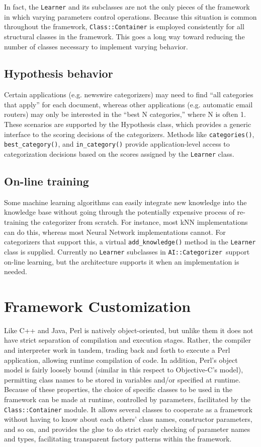 \documentclass[twocolumn]{article}
\newcommand{\method}[1]{\texttt{#1()}}
\newcommand{\class}[1]{\texttt{#1}}
\newcommand{\aicat}{\texttt{AI::Cat\-e\-gor\-i\-zer}}
\begin{document}
In fact, the \class{Learner} and its subclasses are not the only
pieces of the framework in which varying parameters control
operations.  Because this situation is common throughout the
framework, \class{Class::Container} is employed consistently for all
structural classes in the framework.  This goes a long way toward
reducing the number of classes necessary to implement varying
behavior.

\subsection*{Hypothesis behavior}
Certain applications (e.g. newswire categorizers) may need to find
``all categories that apply'' for each document, whereas other
applications (e.g. automatic email routers) may only be interested in
the ``best N categories,'' where N is often 1.  These scenarios are
supported by the Hypothesis class, which provides a generic interface
to the scoring decisions of the categorizers.  Methods like
\method{categories}, \method{best\_category}, and
\method{in\_category} provide application-level access to
categorization decisions based on the scores assigned by the
\class{Learner} class.

\subsection*{On-line training}
Some machine learning algorithms can easily integrate new knowledge
into the knowledge base without going through the potentially
expensive process of re-training the categorizer from scratch.  For
instance, most kNN implementations can do this, whereas most Neural
Network implementations cannot.  For categorizers that support this, a
virtual \method{add\_knowledge} method in the \class{Learner} class
is supplied.  Currently no \class{Learner} subclasses in
\aicat\ support on-line learning, but the
architecture supports it when an implementation is needed.


\section{Framework Customization}

Like C++ and Java, Perl is natively object-oriented, but unlike them it does not have strict separation of compilation and execution stages.  Rather, the compiler and interpreter work in tandem, trading back and forth to execute a Perl application, allowing runtime compilation of code.  In addition, Perl's object model is fairly loosely bound (similar in this respect to Objective-C's model), permitting class names to be stored in variables and/or specified at runtime.  Because of these properties, the choice of specific classes to be used in the framework can be made at runtime, controlled by parameters, facilitated by the \class{Class::Container} module.  It allows several classes to cooperate as a framework without having to know about each others' class names, constructor parameters, and so on, and provides the glue to do strict early checking of parameter names and types, facilitating transparent factory patterns within the framework.
\end{document}
